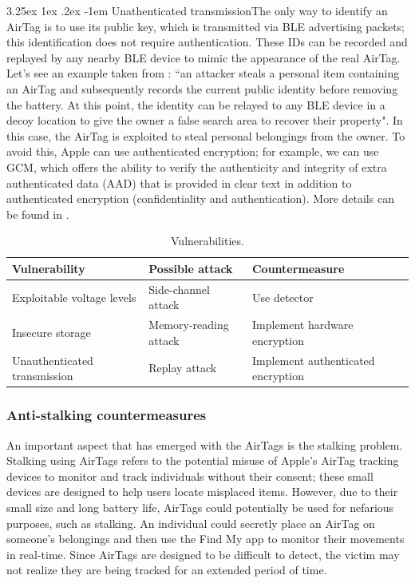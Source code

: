 \documentclass[english]{article}
\makeatletter
\renewcommand\paragraph{\@startsection{paragraph}{5}{\z@}%
  {3.25ex \@plus1ex \@minus.2ex}%
  {-1em}%
  {\normalfont\normalsize\bfseries}}
\makeatother
\begin{document}
\paragraph{Unathenticated transmission}The only way to identify an AirTag is to use its public key, which is transmitted via BLE advertising packets; this identification does not require authentication. These IDs can be recorded and replayed by any nearby BLE device to mimic the appearance of the real AirTag. Let's see an example taken from \cite{reverse}: ``an attacker steals a personal item containing an AirTag and subsequently records the current public identity before removing the battery. At this point, the identity can be relayed to any BLE device in a decoy location to give the owner a false search area to recover their property". In this case, the AirTag is exploited to steal personal belongings from the owner. To avoid this, Apple can use authenticated encryption; for example, we can use GCM, which offers the ability to verify the authenticity and integrity of extra authenticated data (AAD) that is provided in clear text in addition to authenticated encryption (confidentiality and authentication). More details can be found in \cite{gcm}.

\begin{table}[h] 
  \caption{Vulnerabilities.}
  \centering
  \begin{tabularx}{\textwidth}{|X|X|X|}
    \hline
    \textbf{Vulnerability}      & \textbf{Possible attack} & \textbf{Countermeasure}             \\ \hline
    Exploitable voltage levels  & Side-channel attack      & Use detector         \\ \hline
    Insecure storage            & Memory-reading attack    & Implement hardware encryption \\ \hline
    Unauthenticated transmission & Replay attack            & Implement authenticated encryption                     \\ \hline
  \end{tabularx}
  \label{vuln}
\end{table}

\subsubsection{Anti-stalking countermeasures}\label{countermeasures}
An important aspect that has emerged with the AirTags is the stalking problem. Stalking using AirTags refers to the potential misuse of Apple's AirTag tracking devices to monitor and track individuals without their consent; these small devices are designed to help users locate misplaced items. However, due to their small size and long battery life, AirTags could potentially be used for nefarious purposes, such as stalking. An individual could secretly place an AirTag on someone's belongings and then use the Find My app to monitor their movements in real-time. Since AirTags are designed to be difficult to detect, the victim may not realize they are being tracked for an extended period of time.
\end{document}
